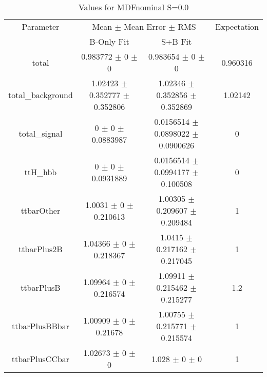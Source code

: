 \begin{table}
\centering
\caption{Values for MDFnominal S=0.0}
\begin{tabular}{cccc}
\toprule
Parameter & \multicolumn{2}{c}{Mean $\pm$ Mean Error $\pm$ RMS} & Expectation\\
 & B-Only Fit & S+B Fit & \\
\midrule
total & \num{0.983772} $\pm$ \num{0} $\pm$ \num{0} & \num{0.983654} $\pm$ \num{0} $\pm$ \num{0} & \num{0.960316}\\
total\_background & \num{1.02423} $\pm$ \num{0.352777} $\pm$ \num{0.352806} & \num{1.02346} $\pm$ \num{0.352856} $\pm$ \num{0.352869} & \num{1.02142}\\
total\_signal & \num{0} $\pm$ \num{0} $\pm$ \num{0.0883987} & \num{0.0156514} $\pm$ \num{0.0898022} $\pm$ \num{0.0900626} & \num{0}\\
ttH\_hbb & \num{0} $\pm$ \num{0} $\pm$ \num{0.0931889} & \num{0.0156514} $\pm$ \num{0.0994177} $\pm$ \num{0.100508} & \num{0}\\
ttbarOther & \num{1.0031} $\pm$ \num{0} $\pm$ \num{0.210613} & \num{1.00305} $\pm$ \num{0.209607} $\pm$ \num{0.209484} & \num{1}\\
ttbarPlus2B & \num{1.04366} $\pm$ \num{0} $\pm$ \num{0.218367} & \num{1.0415} $\pm$ \num{0.217162} $\pm$ \num{0.217045} & \num{1}\\
ttbarPlusB & \num{1.09964} $\pm$ \num{0} $\pm$ \num{0.216574} & \num{1.09911} $\pm$ \num{0.215462} $\pm$ \num{0.215277} & \num{1.2}\\
ttbarPlusBBbar & \num{1.00909} $\pm$ \num{0} $\pm$ \num{0.21678} & \num{1.00755} $\pm$ \num{0.215771} $\pm$ \num{0.215574} & \num{1}\\
ttbarPlusCCbar & \num{1.02673} $\pm$ \num{0} $\pm$ \num{0} & \num{1.028} $\pm$ \num{0} $\pm$ \num{0} & \num{1}\\
\bottomrule
\end{tabular}
\end{table}